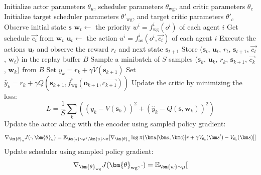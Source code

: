 \begin{algorithm}[h!]
\caption{\sched}
\label{algo:schednet}
\begin{algorithmic}[1]
\State Initialize actor parameters $\theta_u$, scheduler parameters $\theta_\text{wg}$, and critic parameters $\theta_c$
\State Initialize target scheduler parameters $\theta'_\text{wg}$, and target critic parameters $\theta'_{c}$
	\State Observe initial state $\bm{s}$
        \State $\bm{w}_t \gets$ the priority $w^i = f^i_\text{wg}(o^i)$ of each agent $i$
        \State Get schedule $\vec{c_t}$ from $\bm{w}_t$ 
        \State $\bm{u}_t \gets$ the action $u^i = f^i_\text{as}(o^i,   \vec{c_t})$ of each agent $i$  
        \State Execute the actions $\bm{u}_t$ and observe the reward $r_t$ and next state $\bm{s}_{t+1}$
        \State Store ($\bm{s}_t$, $\bm{u}_t$, $r_t$, $\bm{s}_{t+1}$, $\vec{c_t}$, $\bm{w}_t$) in the replay buffer $B$
        \State Sample a minibatch of $S$ samples ($\bm{s}_k$, $\bm{u}_k$, $r_k$, $\bm{s}_{k+1}$, $\vec{c_k}$, $\bm{w}_k$) from $B$
        \State Set $y_k = r_k + \gamma \bar V(\bm{s}_{k+1})$
        \State Set $\hat{y}_k = r_k + \gamma \bar Q(\bm{s}_{k+1}, \bar{f}_\text{wg}^i(\bm{o}_{k+1}, \vec{c_{k+1}}))$
        \State Update the critic by minimizing the loss: 
        \begin{equation*}
        	L  = \frac{1}{S}\sum_k ((y_k - V(\bm{s}_k))^2 + (\hat{y}_k - Q(\bm{s},\bm{w}_k))^2)
        \end{equation*}
        \State Update the actor along with the encoder using sampled policy gradient:
        \begin{equation*}
        \grad_{\bm{\theta}_{\text{u}}} J(\cdot,\bm{\theta}_{\text{u}}) = \mathbb{E}_{\bm{s}\sim \rho^\pi,\bm{u}\sim \pi}[\grad_{\bm{\theta}_{\text{u}}} \log \pi({\bm u}|{\bm o}, {\bm c})[r + \gamma V_{{\theta}_{\text{c}}}({\bm s'}) - V_{{\theta}_{\text{c}}}({\bm s})]]
        \end{equation*}
        \State Update scheduler using sampled policy gradient:
        \begin{equation*}
       	\grad_{\bm{\theta}_{\text{wg}}} J( \bm{\theta}_{\text{wg}} , \cdot ) = \mathbb{E}_{\bm{w} \sim \mu} [

\end{equation*}
\end{algorithmic}
\end{algorithm}
